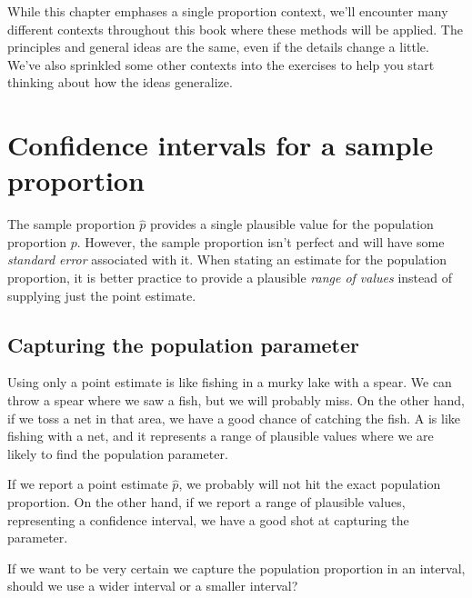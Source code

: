 While this chapter emphases a single proportion
context, we'll encounter many different contexts
throughout this book where these methods will be
applied.
The principles and general ideas are the same,
even if the details change a little.
We've also sprinkled some other contexts into
the exercises to help you start thinking about
how the ideas generalize.


{}





\section{Confidence intervals for a sample proportion}
\label{confidenceIntervals}


The sample proportion $\hat{p}$ provides a single plausible value
for the population proportion $p$. However, the sample proportion
isn't perfect and will have some \emph{standard error}
associated with it.
When stating an estimate for the population  proportion,
it is better practice to provide a plausible
\emph{range of values} instead of supplying just the point
estimate.


\subsection{Capturing the population parameter}

Using only a point estimate is like fishing in a murky
lake with a spear. We can throw a spear where we
saw a fish, but we will probably miss. On the other hand,
if we toss a net in that area, we have a good chance of
catching the fish.
A  is like fishing with a net,
and it represents a range of plausible values where we
are likely to find the population parameter.

If we report a point estimate $\hat{p}$, we probably
will not hit the exact population proportion. On the
other hand, if we report a range of plausible values,
representing a confidence interval,
we have a good shot at capturing the parameter.

\begin{exercisewrap}
\begin{nexercise}
If we want to be very certain we capture the population
proportion in an interval, should we use a wider interval
or a smaller interval?\footnotemark
\end{nexercise}
\end{exercisewrap}

